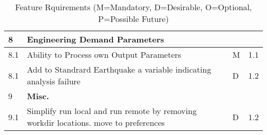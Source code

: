 \begin{table}[hbt!]
\begin{adjustbox}{max width=\textwidth}
\begin{tabular}{llll}
	8 & \textbf{Engineering Demand Parameters} &  &  \\ \hline
	8.1 & Ability to Process own Output Parameters & M & 1.1  \\ \hline
	8.1 & Add to Standrard Earthquake a variable indicating analysis failure & D & 1.2  \\ \hline
	9 & \textbf{Misc.} &  &  \\ \hline
	9.1 & Simplify run local and run remote by removing workdir locations. move to preferences & D & 1.2  \\ \hline
      \bottomrule                                  
  \end{tabular}
\end{adjustbox}
  \caption{Feature Rquirements (M=Mandatory, D=Desirable, O=Optional, P=Possible Future)}             
  \label{tab:featureRequirements}                 
\end{table}


